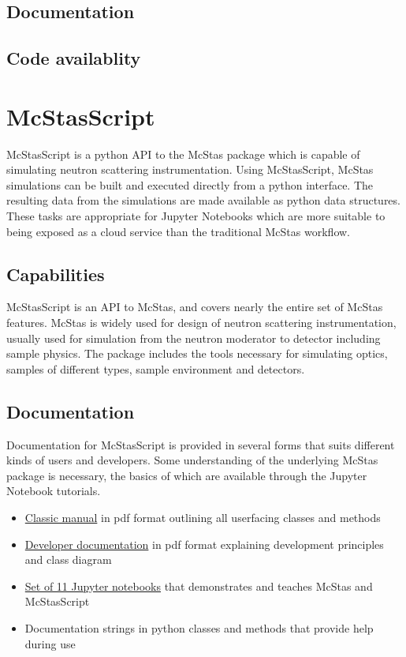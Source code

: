 \documentclass[10pt]{scrartcl}
\begin{document}
\subsection{Documentation}

\subsection{Code availablity}

\section{McStasScript}
McStasScript is a python API to the McStas package which is capable of simulating neutron scattering instrumentation. Using McStasScript, McStas simulations can be built and executed directly from a python interface. The resulting data from the simulations are made available as python data structures. These tasks are appropriate for Jupyter Notebooks which are more suitable to being exposed as a cloud service than the traditional McStas workflow.

\subsection{Capabilities}
McStasScript is an API to McStas, and covers nearly the entire set of McStas features. McStas is widely used for design of neutron scattering instrumentation, usually used for simulation from the neutron moderator to detector including sample physics. The package includes the tools necessary for simulating optics, samples of different types, sample environment and detectors.

\subsection{Documentation}
Documentation for McStasScript is provided in several forms that suits different kinds of users and developers. Some understanding of the underlying McStas package is necessary, the basics of which are available through the Jupyter Notebook tutorials.

\begin{itemize}
  \item \href{https://github.com/PaNOSC-ViNYL/McStasScript/blob/master/McStasScript_developer_documentation.pdf}{Classic manual} in pdf format outlining all userfacing classes and methods
  \item \href{https://github.com/PaNOSC-ViNYL/McStasScript/blob/master/McStasScript_documentation.pdf}{Developer documentation} in pdf format explaining development principles and class diagram
  \item \href{https://github.com/PaNOSC-ViNYL/McStasScript/tree/master/tutorial}{Set of 11 Jupyter notebooks} that demonstrates and teaches McStas and McStasScript
  \item Documentation strings in python classes and methods that provide help during use
\end{itemize}
\end{document}
